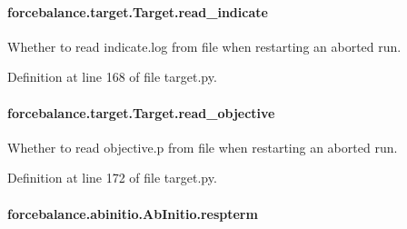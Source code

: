\hypertarget{classforcebalance_1_1target_1_1Target_aa8af57d5be669c4bb1c0cfd4b7a9220e}{
\paragraph[{read\-\_\-indicate}]{\setlength{\rightskip}{0pt plus 5cm}forcebalance.\-target.\-Target.\-read\-\_\-indicate\hspace{0.3cm}{\ttfamily [inherited]}}}\label{classforcebalance_1_1target_1_1Target_aa8af57d5be669c4bb1c0cfd4b7a9220e}


Whether to read indicate.\-log from file when restarting an aborted run. 



Definition at line 168 of file target.\-py.

\hypertarget{classforcebalance_1_1target_1_1Target_a22bdc4bbce2020ae44b44ad3e444fda6}{
\paragraph[{read\-\_\-objective}]{\setlength{\rightskip}{0pt plus 5cm}forcebalance.\-target.\-Target.\-read\-\_\-objective\hspace{0.3cm}{\ttfamily [inherited]}}}\label{classforcebalance_1_1target_1_1Target_a22bdc4bbce2020ae44b44ad3e444fda6}


Whether to read objective.\-p from file when restarting an aborted run. 



Definition at line 172 of file target.\-py.

\hypertarget{classforcebalance_1_1abinitio_1_1AbInitio_a689e3849518b33539442a473a41ed32d}{
\paragraph[{respterm}]{\setlength{\rightskip}{0pt plus 5cm}forcebalance.\-abinitio.\-Ab\-Initio.\-respterm}}\label{classforcebalance_1_1abinitio_1_1AbInitio_a689e3849518b33539442a473a41ed32d}


